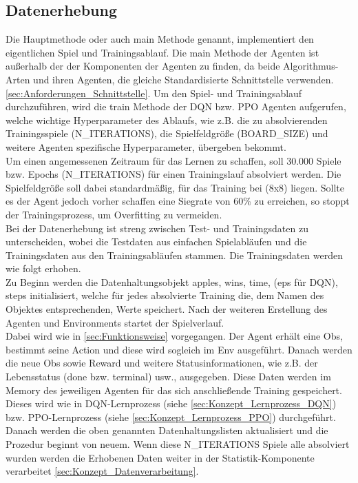 \subsection{Datenerhebung} \label{sec:Konzept_Datenerhebung}
Die Hauptmethode oder auch main Methode genannt, implementiert den eigentlichen Spiel und Trainingsablauf. Die main Methode der Agenten ist außerhalb der der Komponenten der Agenten zu finden, da beide Algorithmus-Arten und ihren Agenten, die gleiche Standardisierte Schnittstelle verwenden. \ref{sec:Anforderungen_Schnittstelle}. 
Um den Spiel- und Trainingsablauf durchzuführen, wird die train Methode der DQN bzw. PPO Agenten aufgerufen, welche wichtige Hyperparameter des Ablaufs, wie z.B. die zu absolvierenden Trainingsspiele (N\_ITERATIONS), die Spielfeldgröße (BOARD\_SIZE) und weitere Agenten spezifische Hyperparameter, übergeben bekommt.\\
Um einen angemessenen Zeitraum für das Lernen zu schaffen, soll 30.000 Spiele bzw. Epochs (N\_ITERATIONS) für einen Trainingslauf absolviert werden. Die Spielfeldgröße soll dabei standardmäßig, für das Training bei (8x8) liegen. Sollte es der Agent jedoch vorher schaffen eine Siegrate von 60\% zu erreichen, so stoppt der Trainingsprozess, um Overfitting zu vermeiden.\\
Bei der Datenerhebung ist streng zwischen Test- und Trainingsdaten zu unterscheiden, wobei die Testdaten aus einfachen Spielabläufen und die Trainingsdaten aus den Trainingsabläufen stammen. Die Trainingsdaten werden wie folgt erhoben.\\
Zu Beginn werden die Datenhaltungsobjekt apples, wins, time, (eps für DQN), steps initialisiert, welche für jedes absolvierte Training die, dem Namen des Objektes entsprechenden, Werte speichert. Nach der weiteren Erstellung des Agenten und Environments startet der Spielverlauf.\\
Dabei wird wie in \ref{sec:Funktionsweise} vorgegangen. Der Agent erhält eine Obs, bestimmt seine Action und diese wird sogleich im Env ausgeführt. Danach werden die neue Obs sowie Reward und weitere Statusinformationen, wie z.B. der Lebensstatus (done bzw. terminal) usw., ausgegeben. Diese Daten werden im Memory des jeweiligen Agenten für das sich anschließende Training gespeichert. Dieses wird wie in DQN-Lernprozess (siehe \ref{sec:Konzept_Lernprozess_DQN}) bzw. PPO-Lernprozess (siehe \ref{sec:Konzept_Lernprozess_PPO}) durchgeführt. Danach werden die oben genannten Datenhaltungslisten aktualisiert und die Prozedur beginnt von neuem. Wenn diese N\_ITERATIONS Spiele alle absolviert wurden werden die Erhobenen Daten weiter in der Statistik-Komponente verarbeitet \ref{sec:Konzept_Datenverarbeitung}.\\
